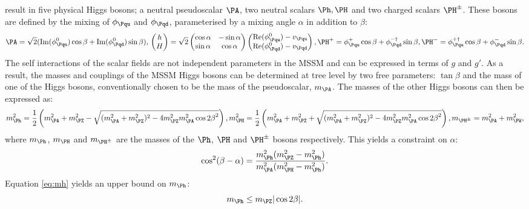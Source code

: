result in five physical Higgs bosons; a neutral pseudoscalar $\PA$, two neutral
scalars $\Ph,\PH$ and two charged scalars $\PH^{\pm}$. These bosons are defined
by the mixing of $\phi_{\Pqu}$ and $\phi_{\Pqd}$, parameterised by a mixing
angle $\alpha$ in addition to $\beta$:
\begin{equation}
\PA = \sqrt{2}(\text{Im}(\phi_{\Pqu}^{0})\cos\beta +
\text{Im}(\phi_{\Pqd}^{0})\sin\beta), \\ 
\begin{pmatrix} h \\ H \end{pmatrix} = \sqrt{2} 
\begin{pmatrix} \cos\alpha & -\sin\alpha \\ \sin\alpha & \cos\alpha \end{pmatrix}
\begin{pmatrix} \text{Re}(\phi_{\Pqu}^{0}) - v_{\Pqu} \\ \text{Re}(\phi_{\Pqd}^{0}) -
v_{\Pqd}\end{pmatrix}, \\
\PH^{+} = \phi_{\Pqu}^{+} \cos \beta + \phi_{\Pqd}^{-\dagger} \sin \beta,\\
\PH^{-} = \phi_{\Pqu}^{+\dagger} \cos \beta + \phi_{\Pqd}^{-} \sin \beta.
\end{equation}
The self interactions of the scalar fields are not independent parameters in the
\ac{MSSM} and can be expressed in terms of $g$ and $g'$. As a result, the masses
and couplings of the \ac{MSSM} Higgs bosons can be determined at tree level by
two free parameters: $\tan\beta$ and the mass of one of the Higgs bosons,
conventionally chosen to be the mass of the pseudoscalar, $m_{\PA}$. The masses
of the other Higgs bosons can then be expressed as:
\begin{equation}
m_{\Ph}^{2} = \frac{1}{2} \left( m_{\PA}^{2} + m_{\PZ}^{2} - \sqrt{(m_{\PA}^{2} +
m_{\PZ}^{2})^{2} - 4m_{\PZ}^{2}m_{\PA}^{2}\cos{2\beta}^{2} }\right) ,
\label{eq:mh}\\
m_{\PH}^{2} = \frac{1}{2} \left( m_{\PA}^{2} + m_{\PZ}^{2} + \sqrt{(m_{\PA}^{2} +
m_{\PZ}^{2})^{2} - 4m_{\PZ}^{2}m_{\PA}^{2}\cos{2\beta}^{2} }\right) , \\
m_{\PH^{\pm}} = m_{\PA}^{2} + m_{\PW}^{2},
\end{equation}
where $m_{\Ph}$, $m_{\PH}$ and $m_{\PH^{\pm}}$ are the masses of the $\Ph$,
$\PH$ and $\PH^{\pm}$ bosons respectively. This yields a constraint on $\alpha$:
\begin{equation}
\cos^{2}(\beta-\alpha) = \frac{m_{\Ph}^{2}(m_{\PZ}^{2} -
m_{\Ph}^{2})}{m_{\PA}^{2}(m_{\PH}^{2} - m_{\Ph}^{2}) }.
\end{equation}
Equation \ref{eq:mh} yields an upper bound on $m_{\Ph}$:
\begin{equation}
m_{\Ph} \leq m_{\PZ} |\cos{2\beta}|. 
\end{equation}

